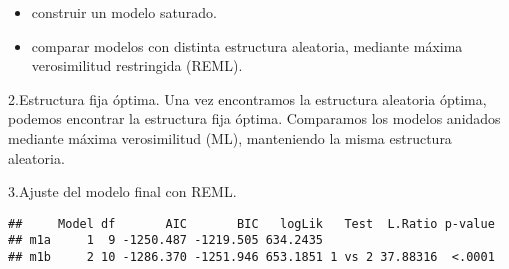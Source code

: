 \documentclass[
]{article}
\newenvironment{Shaded}{\begin{snugshade}}{\end{snugshade}}
\newcommand{\AttributeTok}[1]{\textcolor[rgb]{0.13,0.29,0.53}{#1}}
\newcommand{\CommentTok}[1]{\textcolor[rgb]{0.56,0.35,0.01}{\textit{#1}}}
\newcommand{\DecValTok}[1]{\textcolor[rgb]{0.00,0.00,0.81}{#1}}
\newcommand{\DocumentationTok}[1]{\textcolor[rgb]{0.56,0.35,0.01}{\textbf{\textit{#1}}}}
\newcommand{\FunctionTok}[1]{\textcolor[rgb]{0.13,0.29,0.53}{\textbf{#1}}}
\newcommand{\NormalTok}[1]{#1}
\newcommand{\OtherTok}[1]{\textcolor[rgb]{0.56,0.35,0.01}{#1}}
\newcommand{\SpecialCharTok}[1]{\textcolor[rgb]{0.81,0.36,0.00}{\textbf{#1}}}
\newcommand{\StringTok}[1]{\textcolor[rgb]{0.31,0.60,0.02}{#1}}
\providecommand{\tightlist}{%
  \setlength{\itemsep}{0pt}\setlength{\parskip}{0pt}}
\begin{document}
\begin{itemize}
\tightlist
\item
  construir un modelo saturado.
\item
  comparar modelos con distinta estructura aleatoria, mediante máxima
  verosimilitud restringida (REML).
\end{itemize}

2.Estructura fija óptima. Una vez encontramos la estructura aleatoria
óptima, podemos encontrar la estructura fija óptima. Comparamos los
modelos anidados mediante máxima verosimilitud (ML), manteniendo la
misma estructura aleatoria.

3.Ajuste del modelo final con REML.

\begin{Shaded}
\end{Shaded}

\begin{verbatim}
##     Model df       AIC       BIC   logLik   Test  L.Ratio p-value
## m1a     1  9 -1250.487 -1219.505 634.2435                        
## m1b     2 10 -1286.370 -1251.946 653.1851 1 vs 2 37.88316  <.0001
\end{verbatim}
\end{document}
